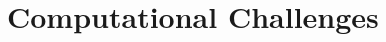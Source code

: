 \documentclass[conference]{IEEEtran}
\begin{document}




\section{Computational Challenges}\label{sec:cc}


\end{document}
